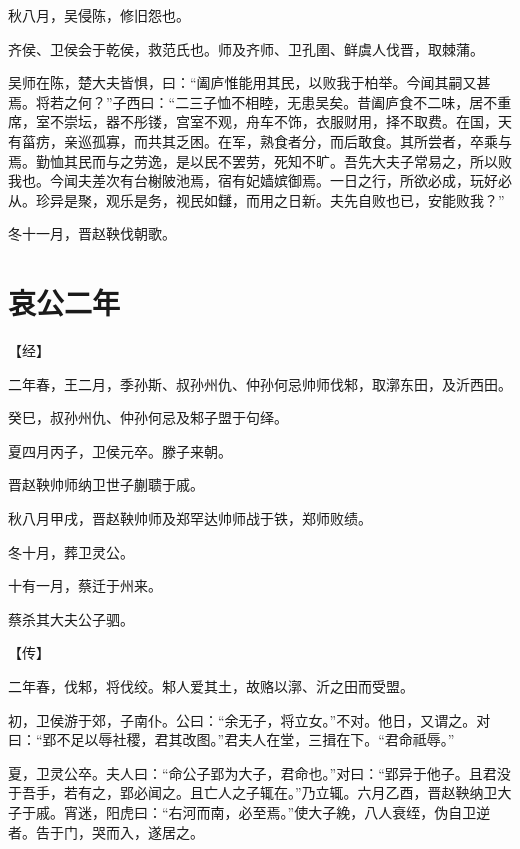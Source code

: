 \documentclass[a4paper,12pt,UTF8,twoside]{ctexbook}
\begin{document}
秋八月，吴侵陈，修旧怨也。

齐侯、卫侯会于乾侯，救范氏也。师及齐师、卫孔圉、鲜虞人伐晋，取棘蒲。

吴师在陈，楚大夫皆惧，曰：“阖庐惟能用其民，以败我于柏举。今闻其嗣又甚焉。将若之何？”子西曰：“二三子恤不相睦，无患吴矣。昔阖庐食不二味，居不重席，室不崇坛，器不彤镂，宫室不观，舟车不饰，衣服财用，择不取费。在国，天有菑疠，亲巡孤寡，而共其乏困。在军，熟食者分，而后敢食。其所尝者，卒乘与焉。勤恤其民而与之劳逸，是以民不罢劳，死知不旷。吾先大夫子常易之，所以败我也。今闻夫差次有台榭陂池焉，宿有妃嫱嫔御焉。一日之行，所欲必成，玩好必从。珍异是聚，观乐是务，视民如讎，而用之日新。夫先自败也已，安能败我？”

冬十一月，晋赵鞅伐朝歌。


\chapter{哀公二年}



【经】

二年春，王二月，季孙斯、叔孙州仇、仲孙何忌帅师伐邾，取漷东田，及沂西田。

癸巳，叔孙州仇、仲孙何忌及邾子盟于句绎。

夏四月丙子，卫侯元卒。滕子来朝。

晋赵鞅帅师纳卫世子蒯聩于戚。

秋八月甲戌，晋赵鞅帅师及郑罕达帅师战于铁，郑师败绩。

冬十月，葬卫灵公。

十有一月，蔡迁于州来。

蔡杀其大夫公子驷。

【传】

二年春，伐邾，将伐绞。邾人爱其土，故赂以漷、沂之田而受盟。

初，卫侯游于郊，子南仆。公曰：“余无子，将立女。”不对。他日，又谓之。对曰：“郢不足以辱社稷，君其改图。”君夫人在堂，三揖在下。“君命祗辱。”

夏，卫灵公卒。夫人曰：“命公子郢为大子，君命也。”对曰：“郢异于他子。且君没于吾手，若有之，郢必闻之。且亡人之子辄在。”乃立辄。六月乙酉，晋赵鞅纳卫大子于戚。宵迷，阳虎曰：“右河而南，必至焉。”使大子絻，八人衰绖，伪自卫逆者。告于门，哭而入，遂居之。
\end{document}
